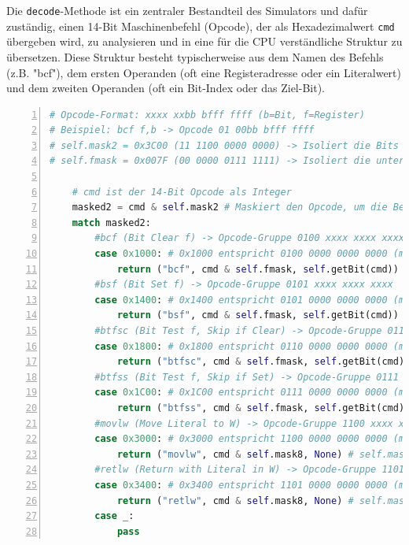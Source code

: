 Die \texttt{decode}-Methode ist ein zentraler Bestandteil des Simulators und dafür zuständig, einen 14-Bit Maschinenbefehl (Opcode), der als Hexadezimalwert \texttt{cmd} übergeben wird, zu analysieren und in eine für die \ac{CPU} verständliche Struktur zu übersetzen. Diese Struktur besteht typischerweise aus dem Namen des Befehls (z.B. "bcf"), dem ersten Operanden (oft eine Registeradresse oder ein Literalwert) und dem zweiten Operanden (oft ein Bit-Index oder das Ziel-Bit).

\begin{lstlisting}[language=Python, caption={Ausschnitt der Decode-Methode im Decode-Modul}, label={lst:decode}, basicstyle=\ttfamily\footnotesize, numbers=left, numberstyle=\tiny\color{gray}]
# Opcode-Format: xxxx xxbb bfff ffff (b=Bit, f=Register)
# Beispiel: bcf f,b -> Opcode 01 00bb bfff ffff
# self.mask2 = 0x3C00 (11 1100 0000 0000) -> Isoliert die Bits 13-10
# self.fmask = 0x007F (00 0000 0111 1111) -> Isoliert die unteren 7 Bits (Register f)

    # cmd ist der 14-Bit Opcode als Integer
    masked2 = cmd & self.mask2 # Maskiert den Opcode, um die Befehlsgruppe zu identifizieren
    match masked2:
        #bcf (Bit Clear f) -> Opcode-Gruppe 0100 xxxx xxxx xxxx
        case 0x1000: # 0x1000 entspricht 0100 0000 0000 0000 (maskiert)
            return ("bcf", cmd & self.fmask, self.getBit(cmd))
        #bsf (Bit Set f) -> Opcode-Gruppe 0101 xxxx xxxx xxxx
        case 0x1400: # 0x1400 entspricht 0101 0000 0000 0000 (maskiert)
            return ("bsf", cmd & self.fmask, self.getBit(cmd))
        #btfsc (Bit Test f, Skip if Clear) -> Opcode-Gruppe 0110 xxxx xxxx xxxx
        case 0x1800: # 0x1800 entspricht 0110 0000 0000 0000 (maskiert)
            return ("btfsc", cmd & self.fmask, self.getBit(cmd))
        #btfss (Bit Test f, Skip if Set) -> Opcode-Gruppe 0111 xxxx xxxx xxxx
        case 0x1C00: # 0x1C00 entspricht 0111 0000 0000 0000 (maskiert)
            return ("btfss", cmd & self.fmask, self.getBit(cmd))
        #movlw (Move Literal to W) -> Opcode-Gruppe 1100 xxxx xxxx xxxx
        case 0x3000: # 0x3000 entspricht 1100 0000 0000 0000 (maskiert)
            return ("movlw", cmd & self.mask8, None) # self.mask8 = 0x00FF
        #retlw (Return with Literal in W) -> Opcode-Gruppe 1101 xxxx xxxx xxxx
        case 0x3400: # 0x3400 entspricht 1101 0000 0000 0000 (maskiert)
            return ("retlw", cmd & self.mask8, None) # self.mask8 = 0x00FF
        case _:
            pass 
\end{lstlisting}

